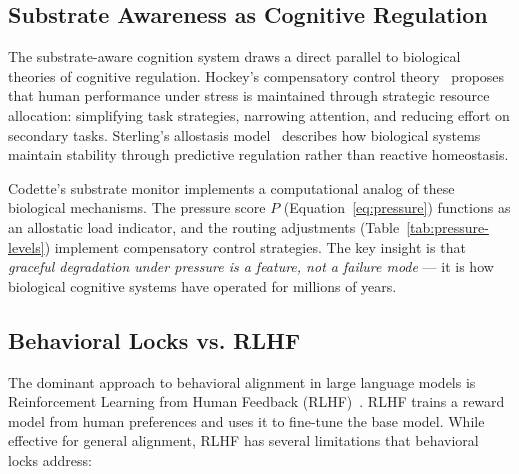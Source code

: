 
%



\subsection{Substrate Awareness as Cognitive Regulation}

The substrate-aware cognition system draws a direct parallel to biological
theories of cognitive regulation. Hockey's compensatory control
theory~\cite{hockey1997compensatory} proposes that human performance under
stress is maintained through strategic resource allocation: simplifying
task strategies, narrowing attention, and reducing effort on secondary tasks.
Sterling's allostasis model~\cite{sterling2012allostasis} describes how
biological systems maintain stability through predictive regulation rather
than reactive homeostasis.

Codette's substrate monitor implements a computational analog of these
biological mechanisms. The pressure score $P$ (Equation~\ref{eq:pressure})
functions as an allostatic load indicator, and the routing adjustments
(Table~\ref{tab:pressure-levels}) implement compensatory control strategies.
The key insight is that \emph{graceful degradation under pressure is a
feature, not a failure mode} --- it is how biological cognitive systems
have operated for millions of years.

\subsection{Behavioral Locks vs. RLHF}

The dominant approach to behavioral alignment in large language models is
Reinforcement Learning from Human Feedback (RLHF)~\cite{ouyang2022training}.
RLHF trains a reward model from human preferences and uses it to fine-tune
the base model. While effective for general alignment, RLHF has several
limitations that behavioral locks address:


